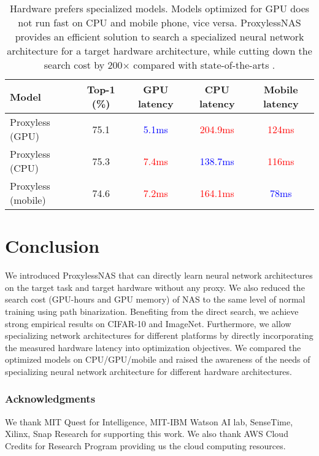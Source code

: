 \documentclass{article} \usepackage{iclr2019_conference,times}
\begin{document}
\begin{table}[t]
\centering
\begin{tabular}{l | c | c | c | c }
			\hline
			Model & Top-1 (\%) & GPU latency & CPU latency & Mobile latency \\
			\hline
			Proxyless (GPU)  & 75.1 & \textcolor{blue}{5.1ms} & \textcolor{red}{204.9ms} & \textcolor{red}{124ms} \\
			\hline
			Proxyless (CPU) & 75.3 & \textcolor{red}{7.4ms} & \textcolor{blue}{138.7ms} & \textcolor{red}{116ms} \\
			\hline
			Proxyless (mobile) & 74.6 & \textcolor{red}{7.2ms} & \textcolor{red}{164.1ms} & \textcolor{blue}{78ms} \\
			\hline
		\end{tabular}
\caption{Hardware prefers specialized models. Models optimized for GPU does not run fast on CPU and mobile phone, vice versa. ProxylessNAS provides an efficient solution to search a specialized neural network architecture for a target hardware architecture, while cutting down the search cost by 200$\times$ compared with state-of-the-arts \citep{zoph2016neural, tan2018mnasnet}. }\label{tab:imagenet_discussion}
\end{table}


 
\section{Conclusion}
We introduced ProxylessNAS that can directly learn neural network architectures on the target task and target hardware without any proxy. We also reduced the search cost (GPU-hours and GPU memory) of NAS to the same level of normal training using path binarization. Benefiting from the direct search, we achieve strong empirical results on CIFAR-10 and ImageNet. Furthermore, we allow specializing network architectures for different platforms by directly incorporating the measured hardware latency into optimization objectives. We compared the optimized models on CPU/GPU/mobile and raised the awareness of the needs of specializing neural network architecture for different hardware architectures. 
 
\subsubsection*{Acknowledgments}
We thank MIT Quest for Intelligence, MIT-IBM Watson AI lab, SenseTime, Xilinx, Snap Research for supporting this work. We also thank AWS Cloud Credits for Research Program providing us the cloud computing resources.
\end{document}
